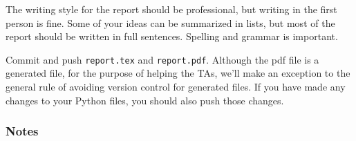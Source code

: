 \documentclass[12pt]{article}
\begin{document}
The writing style for the report should be professional, but writing in the
first person is fine.  Some of your ideas can be summarized in lists, but most
of the report should be written in full sentences.  Spelling and grammar is
important.

Commit and push \texttt {report.tex} and \texttt{report.pdf}.  Although the pdf
file is a generated file, for the purpose of helping the TAs, we'll make an
exception to the general rule of avoiding version control for generated files.
If you have made any changes to your Python files, you should also push those
changes.

\subsubsection*{Notes}
\end{document}
